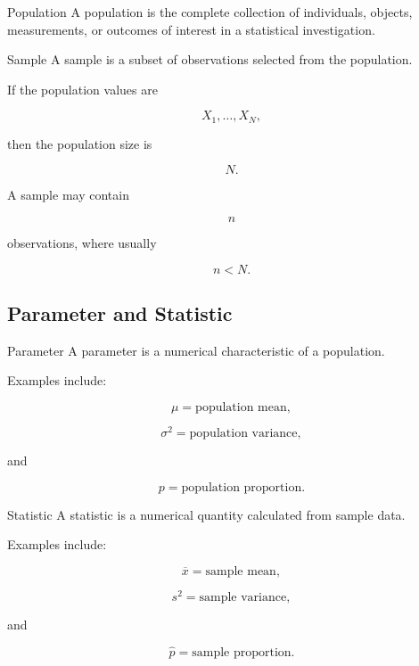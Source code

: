 \begin{definitionbox}{Population}
A population is the complete collection of individuals, objects,
measurements, or outcomes of interest in a statistical investigation.
\end{definitionbox}

\begin{definitionbox}{Sample}
A sample is a subset of observations selected from the population.
\end{definitionbox}

If the population values are

\[
X_1,\ldots,X_N,
\]

then the population size is

\[
N.
\]

A sample may contain

\[
n
\]

observations, where usually

\[
n<N.
\]

\subsection{Parameter and Statistic}
\label{subsec:parameter-statistic}

\begin{definitionbox}{Parameter}
A parameter is a numerical characteristic of a population.
\end{definitionbox}

Examples include:

\[
\boxed{
\mu
=
\text{population mean},
}
\]

\[
\boxed{
\sigma^2
=
\text{population variance},
}
\]

and

\[
\boxed{
p
=
\text{population proportion}.
}
\]

\begin{definitionbox}{Statistic}
A statistic is a numerical quantity calculated from sample data.
\end{definitionbox}

Examples include:

\[
\boxed{
\overline{x}
=
\text{sample mean},
}
\]

\[
\boxed{
s^2
=
\text{sample variance},
}
\]

and

\[
\boxed{
\widehat{p}
=
\text{sample proportion}.
}
\]

